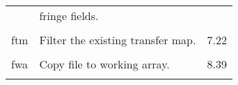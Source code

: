 \begin{center}
\begin{tabular}{lll}
               &             fringe fields.                  &      \\
\vspace{-3mm}& &\\
\hspace{1.5em}ftm   &   Filter the existing transfer map.     & \hspace{2em}7.22\\
\vspace{-3mm}& &\\
\hspace{1.5em}fwa     &     Copy file to working array.    &  \hspace{2em}8.39\\
\vspace{-3mm}& &\\
\end{tabular}


\end{center}
